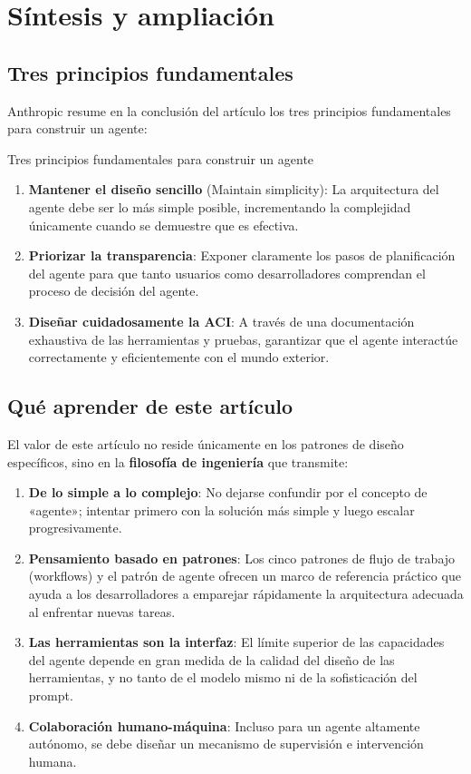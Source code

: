 \section{Síntesis y ampliación}

\subsection{Tres principios fundamentales}

Anthropic resume en la conclusión del artículo los tres principios fundamentales para construir un agente:

\begin{importantbox}{Tres principios fundamentales para construir un agente}
\begin{enumerate}
    \item \textbf{Mantener el diseño sencillo} (Maintain simplicity): La arquitectura del agente debe ser lo más simple posible, incrementando la complejidad únicamente cuando se demuestre que es efectiva.
    \item \textbf{Priorizar la transparencia}: Exponer claramente los pasos de planificación del agente para que tanto usuarios como desarrolladores comprendan el proceso de decisión del agente.
    \item \textbf{Diseñar cuidadosamente la ACI}: A través de una documentación exhaustiva de las herramientas y pruebas, garantizar que el agente interactúe correctamente y eficientemente con el mundo exterior.
\end{enumerate}
\end{importantbox}

\subsection{Qué aprender de este artículo}

El valor de este artículo no reside únicamente en los patrones de diseño específicos, sino en la \textbf{filosofía de ingeniería} que transmite:

\begin{enumerate}
    \item \textbf{De lo simple a lo complejo}: No dejarse confundir por el concepto de «agente»; intentar primero con la solución más simple y luego escalar progresivamente.
    \item \textbf{Pensamiento basado en patrones}: Los cinco patrones de flujo de trabajo (workflows) y el patrón de agente ofrecen un marco de referencia práctico que ayuda a los desarrolladores a emparejar rápidamente la arquitectura adecuada al enfrentar nuevas tareas.
    \item \textbf{Las herramientas son la interfaz}: El límite superior de las capacidades del agente depende en gran medida de la calidad del diseño de las herramientas, y no tanto de el modelo mismo ni de la sofisticación del prompt.
    \item \textbf{Colaboración humano-máquina}: Incluso para un agente altamente autónomo, se debe diseñar un mecanismo de supervisión e intervención humana.
\end{enumerate}

